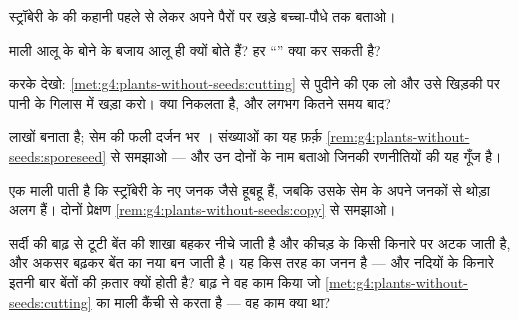 \begin{exercise}[$\star$]\label{exo:g4:plants-without-seeds:6}
स्ट्रॉबेरी के  की कहानी पहले  से लेकर अपने पैरों पर खड़े
बच्चा-पौधे तक बताओ।
\end{exercise}

\begin{exercise}[$\star$]\label{exo:g4:plants-without-seeds:7}
माली आलू के  बोने के बजाय आलू ही क्यों बोते हैं? हर ``'' क्या
कर सकती है?
\end{exercise}

\begin{exercise}[$\star$]\label{exo:g4:plants-without-seeds:8}
करके देखो: \cref{met:g4:plants-without-seeds:cutting} से पुदीने की एक
 लो और उसे खिड़की पर पानी के गिलास में खड़ा करो। क्या निकलता है,
और लगभग कितने समय बाद?
\end{exercise}

\begin{exercise}[$\star\star$]\label{exo:g4:plants-without-seeds:9}
 लाखों  बनाता है; सेम की फली दर्जन भर । संख्याओं का यह
फ़र्क़ \cref{rem:g4:plants-without-seeds:sporeseed} से समझाओ --- और उन
दोनों  के नाम बताओ जिनकी रणनीतियों की यह गूँज है।
\end{exercise}

\begin{exercise}[$\star\star$]\label{exo:g4:plants-without-seeds:10}
एक माली पाती है कि स्ट्रॉबेरी के नए  जनक जैसे हूबहू हैं, जबकि उसके
सेम के  अपने जनकों से थोड़ा अलग हैं। दोनों प्रेक्षण
\cref{rem:g4:plants-without-seeds:copy} से समझाओ।
\end{exercise}

\begin{exercise}[$\star\star\star$]\label{exo:g4:plants-without-seeds:11}
सर्दी की बाढ़ से टूटी बेंत की शाखा बहकर नीचे जाती है और कीचड़ के किसी
किनारे पर अटक जाती है, और अकसर बढ़कर बेंत का नया  बन जाती है। यह
किस तरह का जनन है --- और नदियों के किनारे इतनी बार बेंतों की क़तार
क्यों होती है? बाढ़ ने वह काम किया जो
\cref{met:g4:plants-without-seeds:cutting} का माली कैंची से करता है ---
वह काम क्या था?
\end{exercise}
